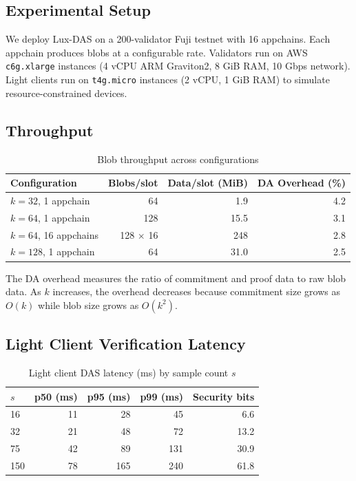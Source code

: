 \documentclass[11pt,a4paper]{article}
\theoremstyle{plain}
\theoremstyle{definition}
\theoremstyle{remark}
\begin{document}
\subsection{Experimental Setup}

We deploy Lux-DAS on a 200-validator Fuji testnet with 16 appchains. Each appchain produces
blobs at a configurable rate. Validators run on AWS \texttt{c6g.xlarge} instances (4 vCPU
ARM Graviton2, 8 GiB RAM, 10 Gbps network). Light clients run on \texttt{t4g.micro} instances
(2 vCPU, 1 GiB RAM) to simulate resource-constrained devices.

\subsection{Throughput}

\begin{table}[H]
\centering
\caption{Blob throughput across configurations}
\label{tab:throughput}
\begin{tabular}{lrrr}
\toprule
\textbf{Configuration} & \textbf{Blobs/slot} & \textbf{Data/slot (MiB)} & \textbf{DA Overhead (\%)} \\
\midrule
$k=32$, 1 appchain & 64 & 1.9 & 4.2 \\
$k=64$, 1 appchain & 128 & 15.5 & 3.1 \\
$k=64$, 16 appchains & 128 $\times$ 16 & 248 & 2.8 \\
$k=128$, 1 appchain & 64 & 31.0 & 2.5 \\
\bottomrule
\end{tabular}
\end{table}

The DA overhead measures the ratio of commitment and proof data to raw blob data. As $k$
increases, the overhead decreases because commitment size grows as $O(k)$ while blob size
grows as $O(k^2)$.

\subsection{Light Client Verification Latency}

\begin{table}[H]
\centering
\caption{Light client DAS latency (ms) by sample count $s$}
\label{tab:light-client-latency}
\begin{tabular}{lrrrr}
\toprule
\textbf{$s$} & \textbf{p50 (ms)} & \textbf{p95 (ms)} & \textbf{p99 (ms)} & \textbf{Security bits} \\
\midrule
16 & 11 & 28 & 45 & 6.6 \\
32 & 21 & 48 & 72 & 13.2 \\
75 & 42 & 89 & 131 & 30.9 \\
150 & 78 & 165 & 240 & 61.8 \\
\bottomrule
\end{tabular}
\end{table}
\end{document}
